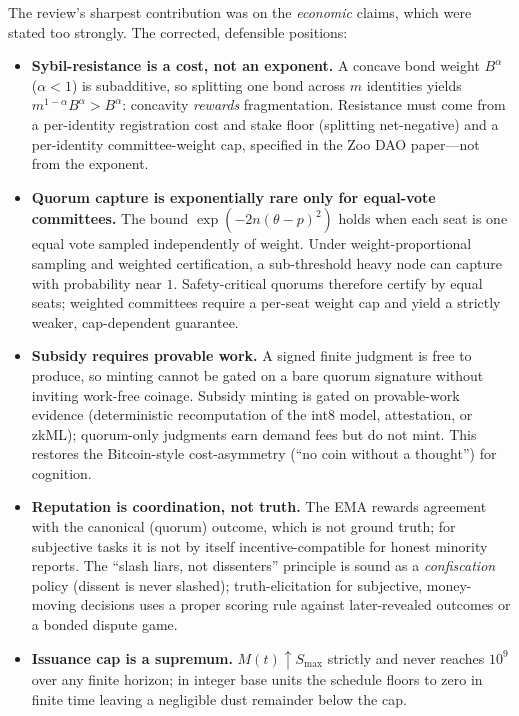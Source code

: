 \documentclass[11pt]{article}
\begin{document}
The review's sharpest contribution was on the \emph{economic} claims, which were
stated too strongly. The corrected, defensible positions:

\begin{itemize}[leftmargin=1.4em]
\item \textbf{Sybil-resistance is a cost, not an exponent.} A concave bond weight
$B^\alpha$ ($\alpha<1$) is subadditive, so splitting one bond across $m$
identities yields $m^{1-\alpha}B^\alpha>B^\alpha$: concavity \emph{rewards}
fragmentation. Resistance must come from a per-identity registration cost and
stake floor (splitting net-negative) and a per-identity committee-weight cap,
specified in the Zoo DAO paper---not from the exponent.

\item \textbf{Quorum capture is exponentially rare only for equal-vote
committees.} The bound $\exp(-2n(\theta-p)^2)$ holds when each seat is one
equal vote sampled independently of weight. Under weight-proportional sampling
and weighted certification, a sub-threshold heavy node can capture with
probability near $1$. Safety-critical quorums therefore certify by equal seats;
weighted committees require a per-seat weight cap and yield a strictly weaker,
cap-dependent guarantee.

\item \textbf{Subsidy requires provable work.} A signed finite judgment is free
to produce, so minting cannot be gated on a bare quorum signature without
inviting work-free coinage. Subsidy minting is gated on provable-work evidence
(deterministic recomputation of the int8 model, attestation, or zkML); quorum-only
judgments earn demand fees but do not mint. This restores the Bitcoin-style
cost-asymmetry (``no coin without a thought'') for cognition.

\item \textbf{Reputation is coordination, not truth.} The EMA rewards agreement
with the canonical (quorum) outcome, which is not ground truth; for subjective
tasks it is not by itself incentive-compatible for honest minority reports. The
``slash liars, not dissenters'' principle is sound as a \emph{confiscation}
policy (dissent is never slashed); truth-elicitation for subjective,
money-moving decisions uses a proper scoring rule against later-revealed outcomes
or a bonded dispute game.

\item \textbf{Issuance cap is a supremum.} $M(t)\uparrow S_{\max}$ strictly and
never reaches $10^9$ over any finite horizon; in integer base units the schedule
floors to zero in finite time leaving a negligible dust remainder below the cap.
\end{itemize}
\end{document}
